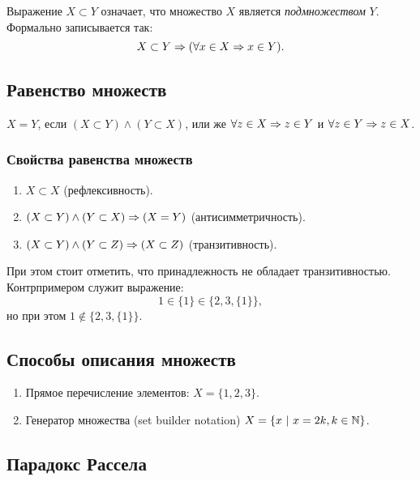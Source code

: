 \begin{definition}
    Выражение $X \subset Y$ означает, что множество $X$ является \textit{подмножеством} $Y$. Формально записывается так:
    $$
        X \subset Y \Rightarrow (\forall x \in X \Rightarrow x \in Y).
    $$
\end{definition}
 
\subsection{Равенство множеств}
 
\begin{definition}
    $X = Y$, если $(X \subset Y) \wedge (Y \subset X)$, или же $\forall z \in X \Rightarrow z \in Y$ и $\forall z \in Y \Rightarrow z \in X$.
\end{definition}
 
\subsubsection*{Свойства равенства множеств}
 
\begin{enumerate}
     \item $X \subset X$ (рефлексивность).
     \item $(X \subset Y) \wedge (Y \subset X) \Rightarrow (X = Y)$ (антисимметричность).
     \item $(X \subset Y) \wedge (Y \subset Z) \Rightarrow (X \subset Z)$ (транзитивность).
\end{enumerate}
 
\begin{note}
    При этом стоит отметить, что принадлежность не обладает транзитивностью. Контрпримером служит выражение:
    $$
        1 \in \{1\} \in \{2, 3, \{1\}\},
    $$
    но при этом $1 \notin \{2, 3, \{1\}\}$.
\end{note}
 
\subsection{Способы описания множеств}
 
\begin{enumerate}
     \item Прямое перечисление элементов: $X = \{1, 2, 3\}$.
     \item Генератор множества (set builder notation) $X = \{x\ |\ x = 2k, k \in \mathbb{N}\}$.
\end{enumerate}
 
\subsection{Парадокс Рассела}
 
